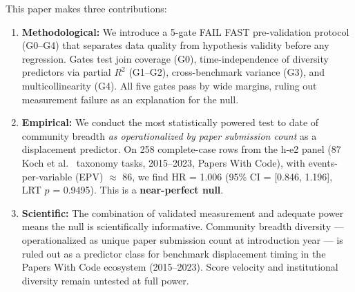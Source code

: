 This paper makes three contributions:

\begin{enumerate}
  \item \textbf{Methodological:} We introduce a 5-gate FAIL FAST pre-validation protocol (G0--G4) that separates data quality from hypothesis validity before any regression. Gates test join coverage (G0), time-independence of diversity predictors via partial $R^{2}$ (G1--G2), cross-benchmark variance (G3), and multicollinearity (G4). All five gates pass by wide margins, ruling out measurement failure as an explanation for the null.

  \item \textbf{Empirical:} We conduct the most statistically powered test to date of community breadth \emph{as operationalized by paper submission count} as a displacement predictor. On 258 complete-case rows from the h-e2 panel (87 Koch et al.\ \cite{koch2021reduced} taxonomy tasks, 2015--2023, Papers With Code), with events-per-variable (EPV) $\approx$ 86, we find HR = 1.006 (95\% CI = [0.846, 1.196], LRT $p$ = 0.9495). This is a \textbf{near-perfect null}.

  \item \textbf{Scientific:} The combination of validated measurement and adequate power means the null is scientifically informative. Community breadth diversity --- operationalized as unique paper submission count at introduction year --- is ruled out as a predictor class for benchmark displacement timing in the Papers With Code ecosystem (2015--2023). Score velocity and institutional diversity remain untested at full power.
\end{enumerate}
